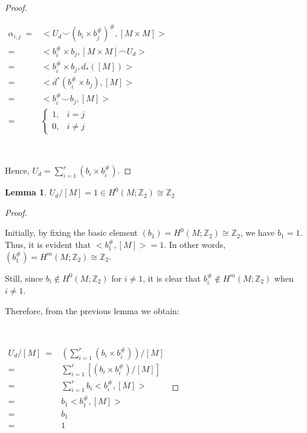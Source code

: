\documentclass[12pt,oneside]{book}
\newtheorem{lem}    {Lemma}[chapter]
\newcommand{\ds}{\displaystyle}
\newcommand{\Z}{\mathbb{Z}}
\newcommand{\ccup}{\smile}
\newcommand{\ccap}{\frown}
\begin{document}
\begin{proof}
        \

        $ \begin{array}{rl}
        	\alpha_{i,j} \ = & < U_{d} \ccup (b_{i} \times b_{j}^{\#})^{\#}, [M \times M] > \\
        	= & < b_{i}^{\#} \times b_{j}, [M \times M] \ccap U_{d} > \\
        	= & < b_{i}^{\#} \times b_{j}, d_{*}([M]) > \\
        	= & < d^{*} (b_{i}^{\#} \times b_{j}), [M] > \\
        	= & < b_{i}^{\#} \ccup b_{j}, [M] > \\
        	= & \left\{ \begin{array}{cl}
        		1, & i = j \\
        		0, & i \neq j
        	\end{array} \right.
        \end{array} $

        \

        Hence, $U_{d} = \ds\sum_{i=1}^{r} (b_{i} \times b_{i}^{\#})$.

    \end{proof}

    \begin{lem}
	    $U_{d}/[M]=1\in H^{0}(M;\Z_{2})\cong\Z_{2}$
    \end{lem}

    \begin{proof}

        \

        Initially, by fixing the basic element $(b_{1})=H^{0}(M;\Z_{2})\cong\Z_{2}$, we have $b_{1}=1$. Thus, it is evident that 
        $<b_{1}^{\#},[M]>=1$. In other words, $(b_{1}^{\#})=H^{m}(M;\Z_{2})\cong\Z_{2}$.

        Still, since $b_{i}\notin H^{0}(M;\Z_{2})$ for $i\neq 1$, it is clear that $b_{i}^{\#}\notin H^{m}(M;\Z_{2})$ when $i\neq 1$.

        Therefore, from the previous lemma we obtain:

        \

        $ \begin{array}{rl}
        	U_{d}/[M] \ = & \left( \ds\sum_{i=1}^{r}(b_{i}\times b_{i}^{\#}) \right)/[M] \\
        	= & \ds\sum_{i=1}^{r}\left[ \left( b_{i}\times b_{i}^{\#} \right)/[M] \right] \\
        	= & \ds\sum_{i=1}^{r}b_{i}<b_{i}^{\#},[M]> \\
        	= & b_{1}<b_{1}^{\#},[M]> \\
        	= & b_{1} \\
        	= & 1
        \end{array} $

    \end{proof}
\end{document}
